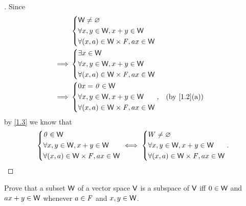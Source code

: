\begin{proof}[]
  Since
  \begin{align*}
             & \begin{dcases}
                 \W \neq \varnothing               \\
                 \forall x, y \in \W, x + y \in \W \\
                 \forall (x, a) \in \W \times \F, ax \in \W
               \end{dcases} \\
    \implies & \begin{dcases}
                 \exists x \in \W                  \\
                 \forall x, y \in \W, x + y \in \W \\
                 \forall (x, a) \in \W \times \F, ax \in \W
               \end{dcases} \\
    \implies & \begin{dcases}
                 0x = \zv \in \W                   \\
                 \forall x, y \in \W, x + y \in \W \\
                 \forall (x, a) \in \W \times \F, ax \in \W
               \end{dcases}, &  & \by{1.2}[a]
  \end{align*}
  by \cref{1.3} we know that
  \[
    \begin{dcases}
      \mathit{0} \in \mathsf{W}                        \\
      \forall x, y \in \mathsf{W}, x + y \in \mathsf{W} \\
      \forall (x, a) \in \mathsf{W} \times \mathit{F}, ax \in \mathsf{W}
    \end{dcases} \iff \begin{dcases}
      W \neq \varnothing                \\
      \forall x, y \in \mathsf{W}, x + y \in \mathsf{W} \\
      \forall (x, a) \in \mathsf{W} \times \mathit{F}, ax \in \mathsf{W}
    \end{dcases}.
  \]
\end{proof}

\begin{ex}\label{ex:1.3.18}
  Prove that a subset \(\mathsf{W}\) of a vector space \(\mathsf{V}\) is a subspace of \(\mathsf{V}\) iff \(0 \in \mathsf{W}\) and \(ax + y \in \mathsf{W}\) whenever \(a \in \mathit{F}\) and \(x, y \in \mathsf{W}\).
\end{ex}

